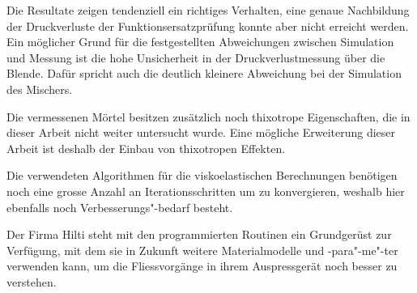 Die Resultate zeigen tendenziell ein richtiges Verhalten, eine genaue Nachbildung der Druckverluste der Funktionsersatzprüfung konnte aber nicht erreicht werden. 
Ein möglicher Grund für die festgestellten Abweichungen zwischen Simulation und Messung ist die hohe Unsicherheit in der Druckverlustmessung über die Blende. Dafür spricht auch die deutlich kleinere Abweichung bei der Simulation des Mischers.

Die vermessenen Mörtel besitzen zusätzlich noch thixotrope Eigenschaften, die in dieser Arbeit nicht weiter untersucht wurde. 
Eine mögliche Erweiterung dieser Arbeit ist deshalb der Einbau von thixotropen Effekten.

Die verwendeten Algorithmen für die viskoelastischen Berechnungen benötigen noch eine grosse Anzahl an Iterationsschritten um zu konvergieren, weshalb hier ebenfalls noch Verbesserungs"-bedarf besteht.

Der Firma Hilti steht mit den programmierten Routinen ein Grundgerüst zur Verfügung, mit dem sie in Zukunft weitere Materialmodelle und -para"-me"-ter verwenden kann, um die Fliessvorgänge in ihrem Auspressgerät noch besser zu verstehen.
